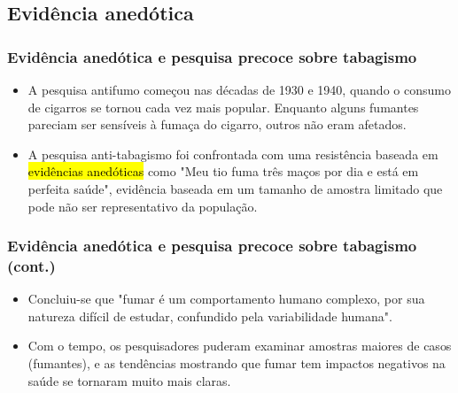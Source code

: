 
\subsection{Evidência anedótica}


\begin{frame}
\frametitle{Evidência anedótica e pesquisa precoce sobre tabagismo}

\begin{itemize}
\justifying
\item A pesquisa antifumo começou nas décadas de 1930 e 1940, quando o consumo de cigarros se tornou cada vez mais popular. Enquanto alguns fumantes pareciam ser sensíveis à fumaça do cigarro, outros não eram afetados.
\vspace{0.5cm}
\justifying
\item A pesquisa anti-tabagismo foi confrontada com uma resistência baseada em \hl{evidências anedóticas} como "Meu tio fuma três maços por dia e está em perfeita saúde", evidência baseada em um tamanho de amostra limitado que pode não ser representativo da população.

\end{itemize}
\end{frame}

\begin{frame}
\frametitle{Evidência anedótica e pesquisa precoce sobre tabagismo (cont.)}

\begin{itemize}
\justifying
\item Concluiu-se que "fumar é um comportamento humano complexo, por sua natureza difícil de estudar, confundido pela variabilidade humana".
\vspace{0.5cm}
\justifying
\item Com o tempo, os pesquisadores puderam examinar amostras maiores de casos (fumantes), e as tendências mostrando que fumar tem impactos negativos na saúde se tornaram muito mais claras.

\end{itemize}


\end{frame}


